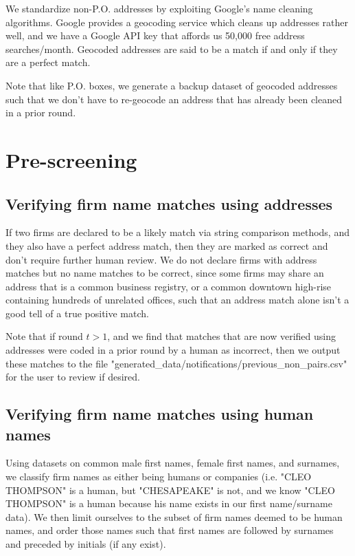 \documentclass{article}
\begin{document}
We standardize non-P.O. addresses by exploiting Google's name cleaning algorithms. Google provides a geocoding service which cleans up addresses rather well, and we have a Google API key that affords us 50,000 free address searches/month. Geocoded addresses are said to be a match if and only if they are a perfect match. 

Note that like P.O. boxes, we generate a backup dataset of geocoded addresses such that we don't have to re-geocode an address that has already been cleaned in a prior round. 

\section{Pre-screening}

\subsection{Verifying firm name matches using addresses}

If two firms are declared to be a likely match via string comparison methods, and they also have a perfect address match, then they are marked as correct and don't require further human review. We do not declare firms with address matches but no name matches to be correct, since some firms may share an address that is a common business registry, or a common downtown high-rise containing hundreds of unrelated offices, such that an address match alone isn't a good tell of a true positive match. 

Note that if round $t > 1$, and we find that matches that are now verified using addresses were coded in a prior round by a human as incorrect, then we output these matches to the file "generated\_data/notifications/previous\_non\_pairs.csv" for the user to review if desired. 

\subsection{Verifying firm name matches using human names}

Using datasets on common male first names, female first names, and surnames, we  classify firm names as either being humans or companies (i.e. "CLEO THOMPSON" is a human, but "CHESAPEAKE" is not, and we know "CLEO THOMPSON" is a human because his name exists in our first name/surname data). We then limit ourselves to the subset of firm names deemed to be human names, and order those names such that first names are followed by surnames and preceded by initials (if any exist). 
\end{document}
